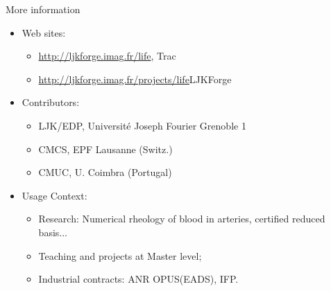 \documentclass[final,utf8,,hyperref={pdfpagelabels=false}]{beamer}
\begin{document}
\begin{frame}[containsverbatim]{}
\begin{columns}[c]
  
    \begin{block}{More information}
      \begin{itemize}
      \item Web sites:
        \begin{itemize}
        \item \url{http://ljkforge.imag.fr/life}, \hfill{Trac}
        \item \url{http://ljkforge.imag.fr/projects/life}\hfill{LJKForge}
        \end{itemize}
      \item Contributors:
        \begin{itemize}
        \item LJK/EDP, Université Joseph Fourier Grenoble 1
        \item CMCS, EPF Lausanne (Switz.)
        \item CMUC, U. Coimbra (Portugal)
        \end{itemize}
      \item Usage Context:
        \begin{itemize}
        \item Research: Numerical rheology of blood in arteries, certified
          reduced basis...
        \item Teaching and projects at Master level;
        \item Industrial contracts: ANR OPUS(EADS), IFP.
        \end{itemize}
      \end{itemize}

      

    \end{block}
  

\end{columns}
\end{frame}
\end{document}

